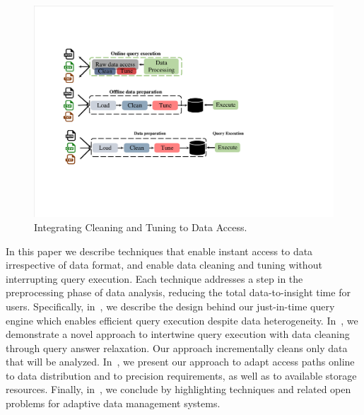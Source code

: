 \begin{figure}[t]
	\begin{center}
		\includegraphics[page=1,width=0.5\columnwidth]{figs/query-execution-online}
		\caption{Integrating Cleaning and Tuning to Data Access.}
		\label{fig:online-query-execution}
	\end{center}
	\vspace{-2em}
\end{figure}

In this paper we describe techniques that enable instant access to 
data irrespective of data format, and enable data cleaning and tuning 
without interrupting query execution. Each technique addresses a step 
in the preprocessing phase of data analysis, reducing the total 
data-to-insight time for users. Specifically, in~, 
we describe the design behind our just-in-time query engine which 
enables efficient query execution despite data heterogeneity. 
In~, we demonstrate a novel approach to intertwine 
query execution with data cleaning through query answer relaxation. 
Our approach incrementally cleans only data that will be analyzed. 
In~, we present our approach to adapt access 
paths online to data distribution and to precision requirements, as 
well as to available storage resources. Finally, 
in~, we conclude by highlighting techniques and 
related open problems for adaptive data management systems.